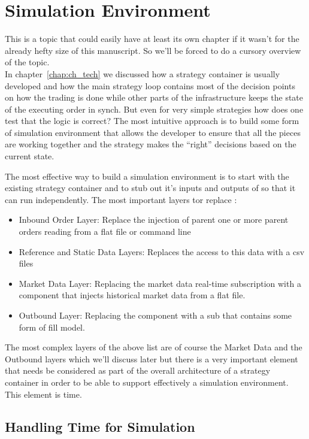\section{Simulation Environment}
This is a topic that could easily have at least its own chapter if it wasn't for the already hefty size of this manuscript. So we'll be forced to do a cursory overview of the topic. \\

In chapter~\ref{chap:ch_tech} we discussed how a strategy container is usually developed and how the main strategy loop contains most of the decision points on how the trading is done while other parts of the infrastructure keeps the state of the executing order in synch. But even for very simple strategies how does one test that the logic is correct? The most intuitive approach is to build some form of simulation environment that allows the developer to ensure that all the pieces are working together and the strategy makes the ``right'' decisions based on the current state. 

The most effective way to build a simulation environment is to start with the existing strategy container and to stub out  it's inputs and outputs of so that it can run independently.  The most important layers tor replace :
\begin{itemize}
\item Inbound Order Layer: Replace the injection of parent one or more parent orders reading from a flat file or command line
\item Reference and Static Data Layers: Replaces the access to this data with a csv files
\item Market Data Layer: Replacing the market data real-time subscription with a component that injects historical market data from a flat file.
\item Outbound Layer: Replacing the component with a sub that contains some form of fill model.
\end{itemize}

The most complex layers of the above list are of course the Market Data and the Outbound layers which we'll discuss later but there is a very important element that needs  be considered as part of the overall architecture of a strategy container in order to be able to support effectively a simulation environment. This element is time.

\subsection{Handling Time for Simulation}

